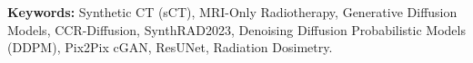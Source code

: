 \documentclass[12pt,a4paper]{report}
\begin{document}
\vspace{15pt}
\noindent \textbf{Keywords:} Synthetic CT (sCT), MRI-Only Radiotherapy, Generative Diffusion Models, CCR-Diffusion, SynthRAD2023, Denoising Diffusion Probabilistic Models (DDPM), Pix2Pix cGAN, ResUNet, Radiation Dosimetry.

\newpage
\tableofcontents

\newpage
\listoffigures

\newpage
\listoftables

\newpage
{}
\setcounter{page}{1}
\pagestyle{vtu}













\newpage


\newpage

\end{document}
